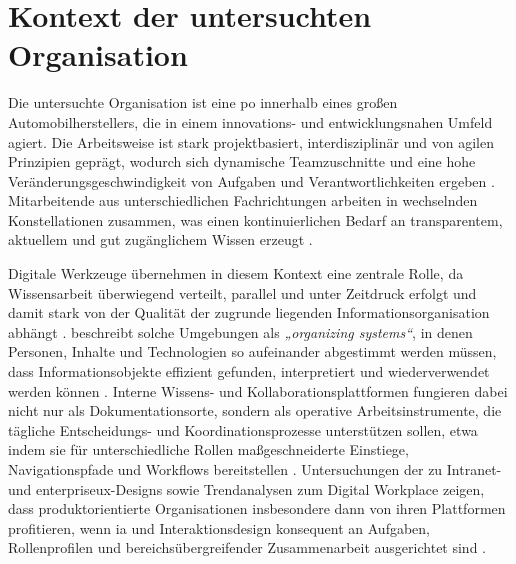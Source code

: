 \section{Kontext der untersuchten Organisation}
\label{sec:03-01_organizational-context}

Die untersuchte Organisation ist eine \acrlong{po} innerhalb eines großen Automobilherstellers, die in einem innovations- und entwicklungsnahen Umfeld agiert. Die Arbeitsweise ist stark projektbasiert, interdisziplinär und von agilen Prinzipien geprägt, wodurch sich dynamische Teamzuschnitte und eine hohe Veränderungsgeschwindigkeit von Aufgaben und Verantwortlichkeiten ergeben \cite{113:NNGIntranetGuidelines,306:DWGDigitalWorkplace}. Mitarbeitende aus unterschiedlichen Fachrichtungen arbeiten in wechselnden Konstellationen zusammen, was einen kontinuierlichen Bedarf an transparentem, aktuellem und gut zugänglichem Wissen erzeugt \cite{419:Glushko2013,113:NNGIntranetGuidelines}.

Digitale Werkzeuge übernehmen in diesem Kontext eine zentrale Rolle, da Wissensarbeit überwiegend verteilt, parallel und unter Zeitdruck erfolgt und damit stark von der Qualität der zugrunde liegenden Informationsorganisation abhängt \cite{419:Glushko2013}. \citeauthor{419:Glushko2013} beschreibt solche Umgebungen als \textit{„organizing systems“}, in denen Personen, Inhalte und Technologien so aufeinander abgestimmt werden müssen, dass Informationsobjekte effizient gefunden, interpretiert und wiederverwendet werden können \cite{419:Glushko2013}. Interne Wissens- und Kollaborationsplattformen fungieren dabei nicht nur als Dokumentationsorte, sondern als operative Arbeitsinstrumente, die tägliche Entscheidungs- und Koordinationsprozesse unterstützen sollen, etwa indem sie für unterschiedliche Rollen maßgeschneiderte Einstiege, Navigationspfade und Workflows bereitstellen \cite{113:NNGIntranetGuidelines,306:DWGDigitalWorkplace}. Untersuchungen der \citeauthor{113:NNGIntranetGuidelines} zu Intranet- und \Gls{enterpriseux}-Designs sowie Trendanalysen zum Digital Workplace zeigen, dass produktorientierte Organisationen insbesondere dann von ihren Plattformen profitieren, wenn \Gls{ia} und Interaktionsdesign konsequent an Aufgaben, Rollenprofilen und bereichsübergreifender Zusammenarbeit ausgerichtet sind \cite{113:NNGIntranetGuidelines,306:DWGDigitalWorkplace}.
